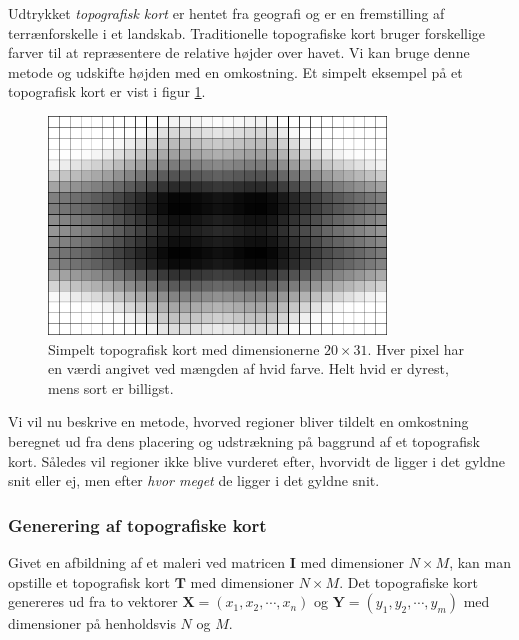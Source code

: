 {
Udtrykket \emph{topografisk kort} er hentet fra geografi og er en
fremstilling af terrænforskelle i et landskab. Traditionelle
topografiske kort bruger forskellige farver til at repræsentere de
relative højder over havet. Vi kan bruge denne metode og udskifte højden
med en omkostning.  Et simpelt eksempel på et topografisk kort er vist i
figur \ref{topography_pixel}.

\begin{figure}[!h]
    \begin{center}
        \includegraphics[width=0.8\textwidth]{afsnit/vores_implementation/billeder/udvidet_loesning/topographic_pixelize.png}
    \end{center}
    \caption[]{Simpelt topografisk kort med dimensionerne $20 \times
    31$. Hver pixel har en værdi angivet ved mængden af hvid farve. Helt
    hvid er dyrest, mens sort er billigst.}
    \label{topography_pixel}
\end{figure}

Vi vil nu beskrive en metode, hvorved regioner bliver tildelt en
omkostning beregnet ud fra dens placering og udstrækning på baggrund af
et topografisk kort. Således vil regioner ikke blive vurderet efter,
hvorvidt de ligger i det gyldne snit eller ej, men efter \emph{hvor
meget} de ligger i det gyldne snit.

\subsubsection{Generering af topografiske kort}
Givet en afbildning af et maleri ved matricen $\mathbf{I}$ med
dimensioner $N \times{} M$, kan man opstille et topografisk kort
$\mathbf{T}$ med dimensioner $N \times{} M$. Det topografiske kort
genereres ud fra to vektorer $\mathbf{X} = \left(x_1, x_2, \cdots,
x_n\right)$ og $\mathbf{Y} = \left(y_1, y_2, \cdots, y_m\right)$ med
dimensioner på henholdsvis $N$ og $M$.

}
